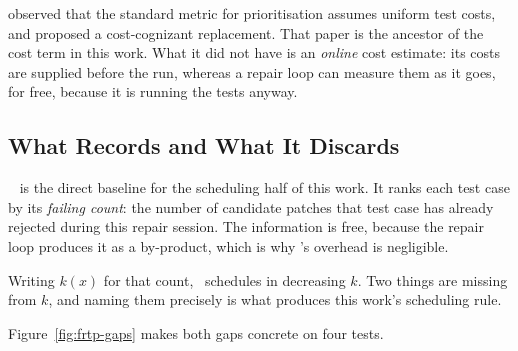 \citet{elbaum2001cost} observed that the standard metric for prioritisation
assumes uniform test costs, and proposed a cost-cognizant replacement. That
paper is the ancestor of the cost term in this work. What it did not have is an
\emph{online} cost estimate: its costs are supplied before the run, whereas a
repair loop can measure them as it goes, for free, because it is running the
tests anyway.

\subsection{What \texorpdfstring{\frtp}{FRTP} Records and What It Discards}
\label{sec:bg-frtp}

\frtp~\citep{qi2013frtp} is the direct baseline for the scheduling half of this
work. It ranks each test case by its \emph{failing count}: the number of
candidate patches that test case has already rejected during this repair
session. The information is free, because the repair loop produces it as a
by-product, which is why \frtp's overhead is negligible.

Writing $k(x)$ for that count, \frtp\ schedules in decreasing $k$. Two things
are missing from $k$, and naming them precisely is what produces this work's
scheduling rule.

Figure~\ref{fig:frtp-gaps} makes both gaps concrete on four tests.

